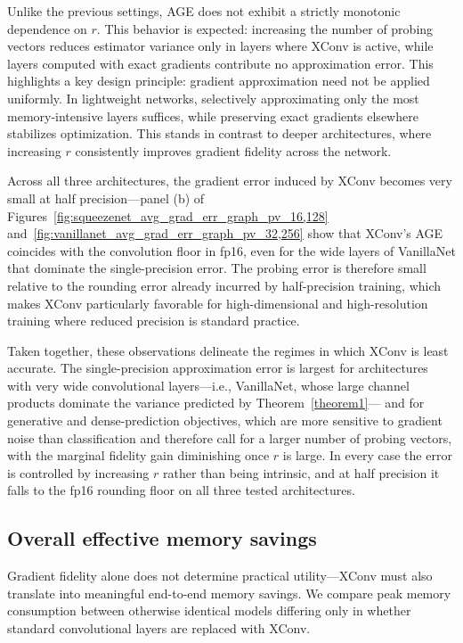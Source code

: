 \documentclass[10pt]{article}
\begin{document}
Unlike the previous settings, AGE does not exhibit a strictly monotonic dependence on $r$. This behavior is expected: increasing the number of probing vectors reduces estimator variance only in layers where XConv is active, while layers computed with exact gradients contribute no approximation error. This highlights a key design principle: gradient approximation need not be applied uniformly. In lightweight networks, selectively approximating only the most memory-intensive layers suffices, while preserving exact gradients elsewhere stabilizes optimization. This stands in contrast to deeper architectures, where increasing $r$ consistently improves gradient fidelity across the network.

Across all three architectures, the gradient error induced by XConv becomes very small at half precision---panel (b) of Figures~\ref{fig:squeezenet_avg_grad_err_graph_pv_16,128} and~\ref{fig:vanillanet_avg_grad_err_graph_pv_32,256} show that XConv's AGE coincides with the convolution floor in fp16, even for the wide layers of VanillaNet that dominate the single-precision error. The probing error is therefore small relative to the rounding error already incurred by half-precision training, which makes XConv particularly favorable for high-dimensional and high-resolution training where reduced precision is standard practice.

Taken together, these observations delineate the regimes in which XConv is least accurate. The single-precision approximation error is largest for architectures with very wide convolutional layers---i.e., VanillaNet, whose large channel products dominate the variance predicted by Theorem~\ref{theorem1}--- and for generative and dense-prediction objectives, which are more sensitive to gradient noise than classification and therefore call for a larger number of probing vectors, with the marginal fidelity gain diminishing once $r$ is large. In every case the error is controlled by increasing $r$ rather than being intrinsic, and at half precision it falls to the fp16 rounding floor on all three tested architectures.

\subsection{Overall effective memory savings}
\label{subsec:network-memory}

Gradient fidelity alone does not determine practical utility---XConv must also translate into meaningful end-to-end memory savings. We compare peak memory consumption between otherwise identical models differing only in whether standard convolutional layers are replaced with XConv.
\end{document}
